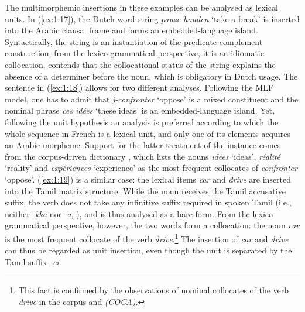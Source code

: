 \noindent The multimorphemic insertions in these examples can be analysed as lexical units. In (\ref{ex:1:17}), the Dutch word string \textit{pauze houden} `take a break' is inserted into the Arabic clausal frame and forms an embedded-language island. Syntactically, the string is an instantiation of the predicate-complement construction; from the lexico-grammatical perspective, it is an idiomatic collocation. \citet[246]{boumans-syntax-1998} contends that the collocational status of the string explains the absence of a determiner before the noun, which is obligatory in Dutch usage. The sentence in (\ref{ex:1:18}) allows for two different analyses. Following the MLF model, one has to admit that \textit{j-confronter} `oppose' is a mixed constituent and the nominal phrase \textit{ces id\'{e}es} `these ideas' is an embedded-language island. Yet, following the unit hypothesis an analysis is preferred according to which the whole sequence in French is a lexical unit, and only one of its elements acquires an Arabic morpheme. Support for the latter treatment of the instance comes from the corpus-driven dictionary , which lists the nouns \textit{idées} `ideas', \textit{réalité} `reality' and \textit{expériences} `experience' as the most frequent collocates of \textit{confronter} `oppose'. (\ref{ex:1:19}) is a similar case: the lexical items \textit{car} and \textit{drive} are inserted into the Tamil matrix structure. While the noun receives the Tamil accusative suffix, the verb does not take any infinitive suffix required in spoken Tamil (i.e., neither \mbox{-\textit{kka}} nor -\textit{a}, \citealt[cf.][73]{schiffman-tamil-1999}), and is thus analysed as a bare form. From the lexico-grammatical perspective, however, the two words form a collocation: the noun \textit{car} is the most frequent collocate of the verb \textit{drive}.\footnote{
This fact is confirmed by the observations of nominal collocates of the verb \textit{drive} in the  corpus and  \textit{(COCA)}.}
The insertion of \textit{car} and \textit{drive} can thus be regarded as unit insertion, even though the unit is separated by the Tamil suffix \textit{-ei}. 

